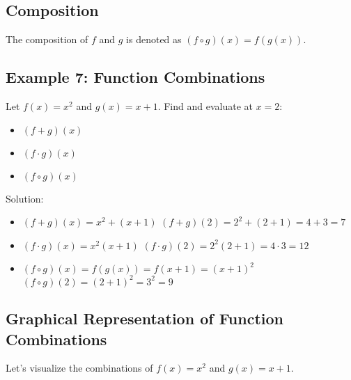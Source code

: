 \documentclass[12pt]{article}
\begin{document}
\subsection{Composition}

The composition of $f$ and $g$ is denoted as $(f \circ g)(x) = f(g(x))$.

\subsection{Example 7: Function Combinations}

Let $f(x) = x^2$ and $g(x) = x + 1$. Find and evaluate at $x = 2$:
\begin{itemize}
    \item $(f + g)(x)$
    \item $(f \cdot g)(x)$
    \item $(f \circ g)(x)$
\end{itemize}

Solution:
\begin{itemize}
    \item $(f + g)(x) = x^2 + (x + 1)$
      $(f + g)(2) = 2^2 + (2 + 1) = 4 + 3 = 7$
    \item $(f \cdot g)(x) = x^2(x + 1)$
      $(f \cdot g)(2) = 2^2(2 + 1) = 4 \cdot 3 = 12$
    \item $(f \circ g)(x) = f(g(x)) = f(x + 1) = (x + 1)^2$
      $(f \circ g)(2) = (2 + 1)^2 = 3^2 = 9$
\end{itemize}

\subsection{Graphical Representation of Function Combinations}

Let's visualize the combinations of $f(x) = x^2$ and $g(x) = x + 1$.

\begin{center}
\end{center}
\end{document}

